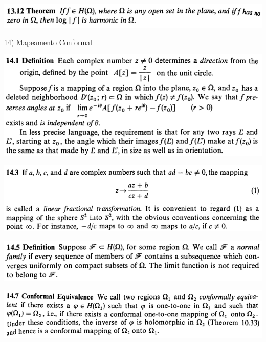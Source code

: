 \documentclass[12pt]{article}
\begin{document}
		\begin{center}
		\includegraphics{13ponto12}
		\end{center}

\vspace{3mm}

14) Mapeamento Conformal

\vspace{3mm}

		\begin{center}
		\includegraphics{d14ponto1}
		\end{center}

		\begin{center}
		\includegraphics[scale=0.9]{d14ponto3}
		\end{center}

		\begin{center}
		\includegraphics{d14ponto5}
		\end{center}

		\begin{center}
		\includegraphics[scale=0.9]{d14ponto7}
		\end{center}
\end{document}
